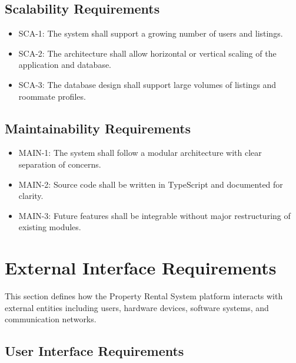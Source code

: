 \subsection{Scalability Requirements}

\begin{itemize}
\item SCA-1: The system shall support a growing number of users and listings.
\item SCA-2: The architecture shall allow horizontal or vertical scaling of the application and database.
\item SCA-3: The database design shall support large volumes of listings and roommate profiles.
\end{itemize}

\subsection{Maintainability Requirements}

\begin{itemize}
\item MAIN-1: The system shall follow a modular architecture with clear separation of concerns.
\item MAIN-2: Source code shall be written in TypeScript and documented for clarity.
\item MAIN-3: Future features shall be integrable without major restructuring of existing modules.
\end{itemize}

\section{External Interface Requirements}

This section defines how the Property Rental System platform interacts with external entities including users, hardware devices, software systems, and communication networks.

\subsection{User Interface Requirements}

